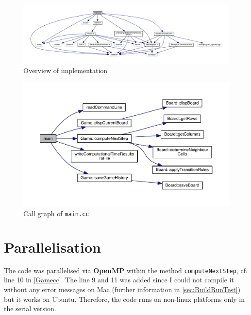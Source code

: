 \begin{figure}
	\includegraphics[width=\textwidth]{doxygen/latex/a00143.pdf}
	\caption{Overview of implementation}
	\label{fig:OverviewOfImplementation}
\end{figure}


\begin{figure}
	\includegraphics[width=\textwidth]{doxygen/latex/a00108_a3c04138a5bfe5d72780bb7e82a18e627_cgraph.pdf}
	\caption{Call graph of \texttt{main.cc}}
	\label{fig:computeNextStepCall}
\end{figure}

%

\section{Parallelisation}
The code was parallelised via \textbf{OpenMP} within the method \texttt{computeNextStep}, cf. line 10 in \cref{Gamecc}. The line 9 and 11 was added since I could not compile it without any error messages on Mac (further information in \cref{sec:BuildRunTest}) but it works on Ubuntu. Therefore, the code runs on non-linux platforms only in the serial version.


